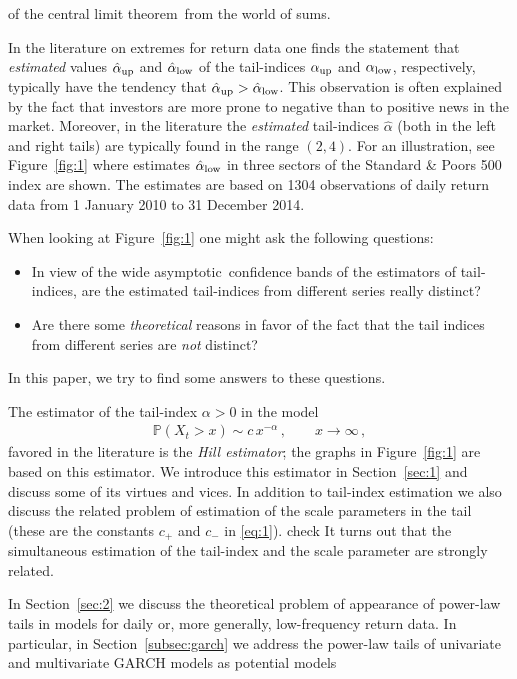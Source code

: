 \documentclass[11pt,a4]{amsart}
\newcommand{\red}{\color{darkred}}
\newcommand{\clt}{central limit theorem}
\newcommand{\asy}{asymptotic}
\newcommand{\fre}{frequenc}
\newcommand{\beao}{\begin{eqnarray*}}
\newcommand{\eeao}{\end{eqnarray*}\noindent}
\newcommand{\xto}{x\to\infty}
\renewcommand{\P }{{\mathbb P}}
\newcommand{\1}{{\mathbf 1}}
\begin{document}
of the \clt\ from the world of sums.
\par
In the literature on extremes for return data one finds the 
statement that {\em estimated} values $\hat \alpha_{\rm up}$ and $\hat \alpha_{\rm low}$ 
of the tail-indices $\alpha_{\rm up}$ and $\alpha_{\rm low}$,
respectively, typically have the tendency that $\hat \alpha_{\rm
  up}>\hat \alpha_{\rm low}$. 
This observation is often explained by the fact that investors are
more prone to negative than to positive news in the market. 
Moreover, in the literature the {\em estimated} tail-indices $\hat \alpha$ (both in the left and right tails) 
are typically found in the range $(2,4)$. For an illustration, see
Figure~\ref{fig:1} where estimates $\hat \alpha_{\rm low}$ 
in three sectors of the Standard \& Poors 500 index  are shown. The
estimates are based on 1304 observations of daily return 
data from 1 January 2010 to 31 December 2014.
\par
When looking at Figure~\ref{fig:1} one might ask the following questions:
\begin{itemize}
\item
In view of the wide \asy\ confidence bands of the estimators of tail-indices, 
are the estimated tail-indices from different series really distinct?
\item
Are there some {\em theoretical} reasons in favor of the fact that the tail indices from different series are {\em not} 
distinct?
\end{itemize}
In this paper, we try to find some answers to these questions. 
\par
The estimator of the tail-index $\alpha>0$  in the model
\beao
\P(X_t>x)\sim c\,x^{-\alpha}\,,\qquad \xto\,,
\eeao
favored in the literature  is the {\em Hill estimator}; the graphs in 
Figure~\ref{fig:1} are based on this estimator. We introduce this estimator in Section~\ref{sec:1} and discuss 
some of its virtues and vices. In addition to tail-index estimation we also discuss the related problem of
estimation of the scale parameters in the tail (these are the constants $c_+$ and $c_-$ in \eqref{eq:1}). {\red check} It turns out 
that the simultaneous estimation of the tail-index and the scale parameter are strongly related.
\par
In Section~\ref{sec:2} we discuss the theoretical problem of appearance of power-law tails in models 
for daily or, more generally, low-\fre y 
return data. In particular, in Section~\ref{subsec:garch} we address the power-law tails of univariate and multivariate GARCH models as potential models
\end{document}
